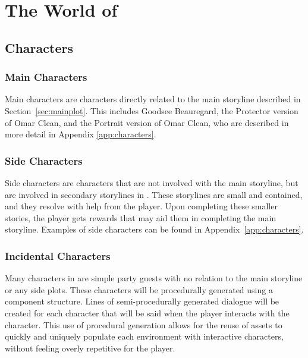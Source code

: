 \chapter{The World of \ourgame{}}





\clearpage
\section{Characters}

\subsection{Main Characters}
Main characters are characters directly related to the main storyline described in Section~\ref{sec:mainplot}. This includes Goodsee Beauregard, the Protector version of Omar Clean, and the Portrait version of Omar Clean, who are described in more detail in Appendix \ref{app:characters}.

\subsection{Side Characters}
Side characters are characters that are not involved with the main storyline, but are involved in secondary storylines in \ourgame{}. These storylines are small and contained, and they resolve with help from the player. Upon completing these smaller stories, the player gets rewards that may aid them in completing the main storyline. Examples of side characters can be found in Appendix~\ref{app:characters}.

\subsection{Incidental Characters}
Many characters in \ourgame{} are simple party guests with no relation to the main storyline or any side plots. These characters will be procedurally generated using a component structure. Lines of semi-procedurally generated dialogue will be created for each character that will be said when the player interacts with the character. This use of procedural generation allows for the reuse of assets to quickly and uniquely populate each environment with interactive characters, without feeling overly repetitive for the player.